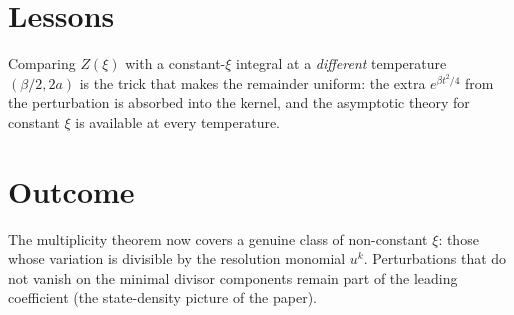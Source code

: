 \documentclass[11pt]{article}
\begin{document}
\section{Lessons}
Comparing $Z(\xi)$ with a constant-$\xi$ integral at a \emph{different} temperature $(\beta/2,2a)$ is
the trick that makes the remainder uniform: the extra $e^{\beta t^2/4}$ from the perturbation is
absorbed into the kernel, and the asymptotic theory for constant $\xi$ is available at every
temperature.

\section{Outcome}
The multiplicity theorem now covers a genuine class of non-constant $\xi$: those whose variation is
divisible by the resolution monomial $u^k$. Perturbations that do not vanish on the minimal divisor
components remain part of the leading coefficient (the state-density picture of the paper).
\end{document}
